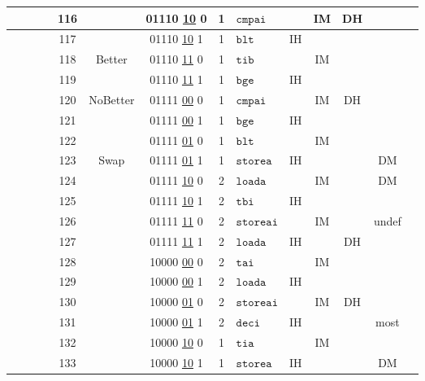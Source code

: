 \documentclass[a4paper]{article}
\begin{document}
\begin{center}
\begin{tabular}{|c|c|c|c|c|c|c|c|l|c|c|c|c|c|}
\hline
& \cellcolor{yellow} & & & 116 &  & 01110 \underline{10} 0 & 1 & $\texttt{cmpai}$ &  & IM & DH &  &  \\
\hline
& \cellcolor{yellow} & & & 117 &  & 01110 \underline{10} 1 & 1 & $\texttt{blt}$ & IH &  &  &  &  \\
\hline
& & \cellcolor{green} & & 118 & Better & 01110 \underline{11} 0 & 1 & $\texttt{tib}$ &  & IM &  &  &  \\
\hline
& & \cellcolor{green} & & 119 &  & 01110 \underline{11} 1 & 1 & $\texttt{bge}$ & IH &  &  &  &  \\
\hline
& & \cellcolor{green} & & 120 & NoBetter & 01111 \underline{00} 0 & 1 & $\texttt{cmpai}$ &  & IM & DH &  &  \\
\hline
& & \cellcolor{green} & & 121 &  & 01111 \underline{00} 1 & 1 & $\texttt{bge}$ & IH &  &  &  &  \\
\hline
& & \cellcolor{green} & & 122 &  & 01111 \underline{01} 0 & 1 & $\texttt{blt}$ &  & IM &  &  &  \\
\hline
& & & \cellcolor{red} & 123 & Swap & 01111 \underline{01} 1 & 1 & $\texttt{storea}$ & IH &  &  & DM &  \\
\hline
& & & \cellcolor{red} & 124 &  & 01111 \underline{10} 0 & 2 & $\texttt{loada}$ &  & IM &  & DM &  \\
\hline
& & & \cellcolor{red} & 125 &  & 01111 \underline{10} 1 & 2 & $\texttt{tbi}$ & IH &  &  &  &  \\
\hline
& & & \cellcolor{red} & 126 &  & 01111 \underline{11} 0 & 2 & $\texttt{storeai}$ &  & IM &  & undef &  \\
\hline
& & & \cellcolor{red} & 127 &  & 01111 \underline{11} 1 & 2 & $\texttt{loada}$ & IH &  & DH &  &  \\
\hline
& & & \cellcolor{red} & 128 &  & 10000 \underline{00} 0 & 2 & $\texttt{tai}$ &  & IM &  &  &  \\
\hline
& & & \cellcolor{red} & 129 &  & 10000 \underline{00} 1 & 2 & $\texttt{loada}$ & IH &  &  &  &  \\
\hline
& & & \cellcolor{red} & 130 &  & 10000 \underline{01} 0 & 2 & $\texttt{storeai}$ &  & IM & DH &  &  \\
\hline
& & & \cellcolor{red} & 131 &  & 10000 \underline{01} 1 & 2 & $\texttt{deci}$ & IH &  &  & most &  \\
\hline
& & & \cellcolor{red} & 132 &  & 10000 \underline{10} 0 & 1 & $\texttt{tia}$ &  & IM &  &  &  \\
\hline
& & & \cellcolor{red} & 133 &  & 10000 \underline{10} 1 & 1 & $\texttt{storea}$ & IH &  &  & DM &  \\

\end{tabular}
\end{center}
\end{document}
